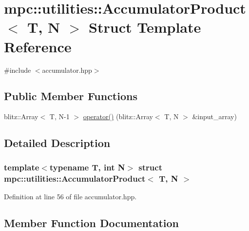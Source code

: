 \hypertarget{structmpc_1_1utilities_1_1_accumulator_product}{}\section{mpc\+:\+:utilities\+:\+:Accumulator\+Product$<$ T, N $>$ Struct Template Reference}
\label{structmpc_1_1utilities_1_1_accumulator_product}


{\ttfamily \#include $<$accumulator.\+hpp$>$}

\subsection*{Public Member Functions}
\begin{DoxyCompactItemize}
\item 
blitz\+::\+Array$<$ T, N-\/1 $>$ \mbox{\hyperlink{structmpc_1_1utilities_1_1_accumulator_product_a50f1ad7f64867b9ee0e5479207017aca}{operator()}} (blitz\+::\+Array$<$ T, N $>$ \&input\+\_\+array)
\end{DoxyCompactItemize}


\subsection{Detailed Description}
\subsubsection*{template$<$typename T, int N$>$\newline
struct mpc\+::utilities\+::\+Accumulator\+Product$<$ T, N $>$}



Definition at line 56 of file accumulator.\+hpp.



\subsection{Member Function Documentation}
\mbox{\label{structmpc_1_1utilities_1_1_accumulator_product_a50f1ad7f64867b9ee0e5479207017aca}} 
